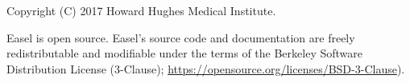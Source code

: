 \vspace*{\fill}
\begin{flushleft}
Copyright (C) 2017 Howard Hughes Medical Institute.

\vspace{2em} 

Easel is open source.  Easel's source code and documentation are
freely redistributable and modifiable under the terms of the Berkeley
Software Distribution License (3-Clause);
\url{https://opensource.org/licenses/BSD-3-Clause}).

\end{flushleft}








